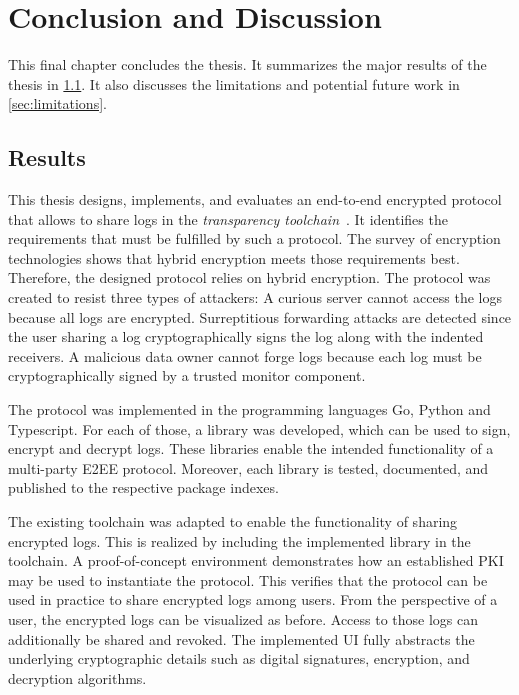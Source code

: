 \documentclass[../main.tex]{subfiles}
\begin{document}
\chapter{Conclusion and Discussion}
\label{chap:conclusion}

This final chapter concludes the thesis.
It summarizes the major results of the thesis in \cref{sec:result}.
It also discusses the limitations and potential future work in \cref{sec:limitations}.

\section{Results}
\label{sec:result}

This thesis designs, implements, and evaluates an end-to-end encrypted protocol that allows to share logs in the \emph{transparency toolchain}~\cite{Zieglmeier2021}.
It identifies the requirements that must be fulfilled by such a protocol.
The survey of encryption technologies shows that hybrid encryption meets those requirements best.
Therefore, the designed protocol relies on hybrid encryption.
The protocol was created to resist three types of attackers: 
A curious server cannot access the logs because all logs are encrypted.
Surreptitious forwarding attacks are detected since the user sharing a log cryptographically signs the log along with the indented receivers.
A malicious data owner cannot forge logs because each log must be cryptographically signed by a trusted monitor component.

The protocol was implemented in the programming languages Go, Python and Typescript.
For each of those, a library was developed, which can be used to sign, encrypt and decrypt logs.
These libraries enable the intended functionality of a multi-party E2EE protocol.
Moreover, each library is tested, documented, and published to the respective package indexes.

The existing toolchain was adapted to enable the functionality of sharing encrypted logs.
This is realized by including the implemented library in the toolchain.
A proof-of-concept environment demonstrates how an established PKI may be used to instantiate the protocol.
This verifies that the protocol can be used in practice to share encrypted logs among users.
From the perspective of a user, the encrypted logs can be visualized as before. 
Access to those logs can additionally be shared and revoked.
The implemented UI fully abstracts the underlying cryptographic details such as digital signatures, encryption, and decryption algorithms.
\end{document}
